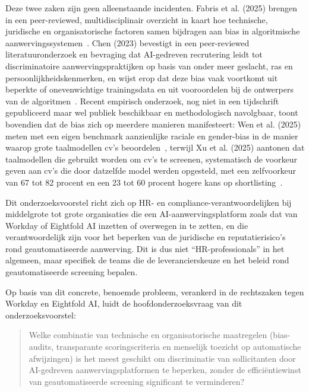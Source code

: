 \documentclass{hogent-article}
\begin{document}
Deze twee zaken zijn geen alleenstaande incidenten. Fabris et al. (2025)
brengen in een peer-reviewed, multidisciplinair overzicht in kaart hoe
technische, juridische en organisatorische factoren samen bijdragen aan bias
in algoritmische aanwervingssystemen~\autocite{Fabris2025}. Chen (2023)
bevestigt in een peer-reviewed literatuuronderzoek en bevraging dat
AI-gedreven recrutering leidt tot discriminatoire aanwervingspraktijken op
basis van onder meer geslacht, ras en persoonlijkheidskenmerken, en wijst
erop dat deze bias vaak voortkomt uit beperkte of onevenwichtige
trainingsdata en uit vooroordelen bij de ontwerpers van de
algoritmen~\autocite{Chen2023}. Recent empirisch onderzoek, nog niet in een
tijdschrift gepubliceerd maar wel publiek beschikbaar en methodologisch
navolgbaar, toont bovendien dat de bias zich op meerdere manieren
manifesteert: Wen et al. (2025) meten met een eigen benchmark aanzienlijke
raciale en gender-bias in de manier waarop grote taalmodellen cv's
beoordelen~\autocite{Wen2025}, terwijl Xu et al. (2025) aantonen dat
taalmodellen die gebruikt worden om cv's te screenen, systematisch de
voorkeur geven aan cv's die door datzelfde model werden opgesteld, met een
zelfvoorkeur van 67 tot 82 procent en een 23 tot 60 procent hogere kans op
shortlisting~\autocite{Xu2025}.

Dit onderzoeksvoorstel richt zich op HR- en compliance-verantwoordelijken bij
middelgrote tot grote organisaties die een AI-aanwervingsplatform zoals dat
van Workday of Eightfold AI inzetten of overwegen in te zetten, en die
verantwoordelijk zijn voor het beperken van de juridische en
reputatierisico's rond geautomatiseerde aanwerving. Dit is dus niet
``HR-professionals'' in het algemeen, maar specifiek de teams die de
leverancierskeuze en het beleid rond geautomatiseerde screening bepalen.

Op basis van dit concrete, benoemde probleem, verankerd in de rechtszaken
tegen Workday en Eightfold AI, luidt de hoofdonderzoeksvraag van dit
onderzoeksvoorstel:

\begin{quote}
  Welke combinatie van technische en organisatorische maatregelen
  (bias-audits, transparante scoringscriteria en menselijk toezicht op
  automatische afwijzingen) is het meest geschikt om discriminatie van
  sollicitanten door AI-gedreven aanwervingsplatformen te beperken, zonder
  de efficiëntiewinst van geautomatiseerde screening significant te
  verminderen?
\end{quote}
\end{document}
